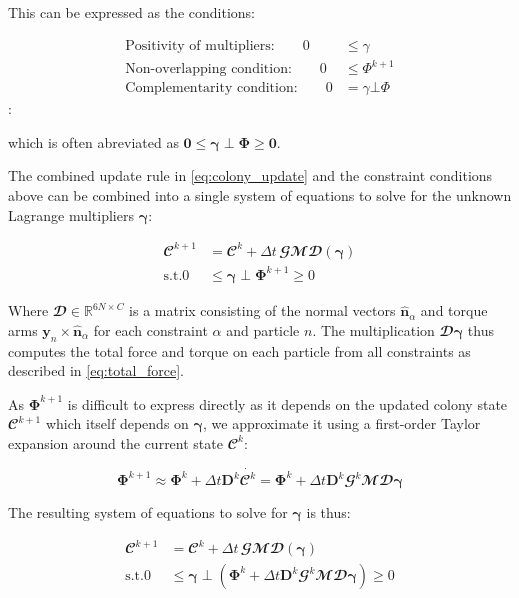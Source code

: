\documentclass[conference]{IEEEtran}
\begin{document}
This can be expressed as the conditions:

\begin{align}
    \text{Positivity of multipliers:} \qquad  0 & \leq \gamma        \\
    \text{Non-overlapping condition:} \qquad  0 & \leq \Phi^{k+1}    \\
    \text{Complementarity condition:} \qquad  0 & = \gamma \bot \Phi
\end{align}:

which is often abreviated as $\mathbf{0} \leq \mathbf{\gamma} \perp \mathbf{\Phi} \geq \mathbf{0}$.


The combined update rule in \autoref{eq:colony_update} and the constraint conditions above can be combined into a single system of equations to solve for the unknown Lagrange multipliers $\mathbf{\gamma}$:

\begin{align}
    \mathbfcal{C}^{k+1} & = \mathbfcal{C}^k + \Delta t \, \mathbfcal{G}\mathbfcal{M} \mathbfcal{D}(\mathbf{\gamma}) \\
    \text{s.t.} 0       & \leq \mathbf{\gamma} \perp \mathbf{\Phi}^{k+1} \geq 0
\end{align}

Where $\mathbfcal{D} \in \mathbb{R}^{6N \times C}$ is a matrix consisting of the normal vectors $\hat{\mathbf{n}}_\alpha$ and torque arms $\mathbf{y}_n \times \hat{\mathbf{n}}_\alpha$ for each constraint $\alpha$ and particle $n$. The multiplication $\mathbfcal{D}\mathbf{\gamma}$ thus computes the total force and torque on each particle from all constraints as described in \autoref{eq:total_force}.


As $\mathbf{\Phi}^{k+1}$ is difficult to express directly as it depends on the updated colony state $\mathbfcal{C}^{k+1}$ which itself depends on $\mathbf{\gamma}$, we approximate it using a first-order Taylor expansion around the current state $\mathbfcal{C}^k$:

\begin{equation}
    \mathbf{\Phi}^{k+1} \approx \mathbf{\Phi}^k + \Delta t \mathbf{D}^k \dot{\mathbfcal{C}^k} = \mathbf{\Phi}^k + \Delta t \mathbf{D}^k \mathbfcal{G}^k \mathbfcal{M} \mathbfcal{D} \mathbf{\gamma}
\end{equation}

The resulting system of equations to solve for $\mathbf{\gamma}$ is thus:

\begin{align}
    \mathbfcal{C}^{k+1} & = \mathbfcal{C}^k + \Delta t \, \mathbfcal{G}\mathbfcal{M} \mathbfcal{D}(\mathbf{\gamma})                                                            \\
    \text{s.t.} 0       & \leq \mathbf{\gamma} \perp \left( \mathbf{\Phi}^k + \Delta t \mathbf{D}^k \mathbfcal{G}^k \mathbfcal{M} \mathbfcal{D} \mathbf{\gamma} \right) \geq 0
\end{align}
\end{document}
